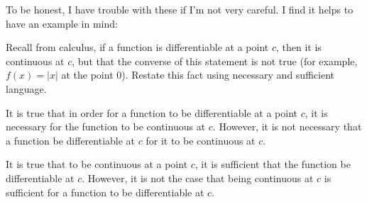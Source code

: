 \documentclass[12pt]{article}
\begin{document}
To be honest, I have trouble with these if I'm not very careful.  I find it helps to have an example in mind:

\begin{example}
 Recall from calculus, if a function is differentiable at a point $c$, then it is continuous at $c$, but that the converse of this statement is not true (for example, $f(x) = |x|$ at the point 0).  Restate this fact using necessary and sufficient language.

 \begin{solution}
  It is true that in order for a function to be differentiable at a point $c$, it is necessary for the function to be continuous at $c$.  However, it is not necessary that a function be differentiable at $c$ for it to be continuous at $c$.

  It is true that to be continuous at a point $c$, it is sufficient that the function be differentiable at $c$.  However, it is not the case that being continuous at $c$ is sufficient for a function to be differentiable at $c$.
 \end{solution}
\end{example}
\end{document}

